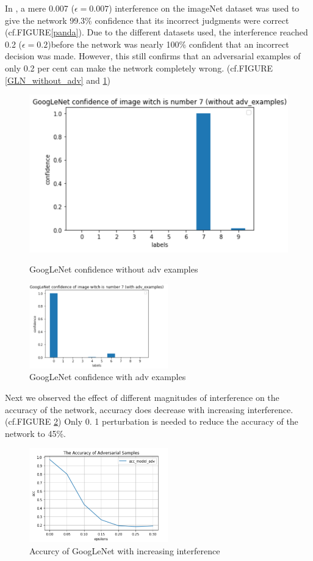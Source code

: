 In \cite{szegedy2013intriguing}, a mere 0.007 ($\epsilon=0.007$) interference on the imageNet dataset was used to give the network 99.3\% confidence that its incorrect judgments were correct (cf.FIGURE\ref{panda}). Due to the different datasets used, the interference reached 0.2 ($\epsilon=0.2$)before the network was nearly 100\% confident that an incorrect decision was made. However, this still confirms that an adversarial examples of only 0.2 per cent can make the network completely wrong. (cf.FIGURE \ref{GLN_without_adv} and \ref{GLN_with_adv})

\begin{figure}[htbp]
\centering
\begin{minipage}[t]{0.48\textwidth}
\centering
\includegraphics[width=6 cm]{GLN confiance without adv 7.png}
\caption{GoogLeNet confidence without adv examples}
\label{GLN_without_adv}
\end{minipage}
\begin{minipage}[t]{0.48\textwidth}
\centering
\includegraphics[width=6cm]{GLN confiance with adv 7.png}
\caption{GoogLeNet confidence with adv examples}
\label{GLN_with_adv}
\end{minipage}
\end{figure}
Next we observed the effect of different magnitudes of interference on the accuracy of the network, accuracy does decrease with increasing interference. (cf.FIGURE \ref{acc_GLN}) Only 0. 1 perturbation is needed to reduce the accuracy of the network to 45\%.
\FloatBarrier
\begin{figure}[htbp]
        \centering
        \includegraphics[width=6cm]{Acc of GLN with adv exp.PNG}%
        \caption{Accurcy of GoogLeNet with increasing interference}
        \label{acc_GLN}
\end{figure}\par
\FloatBarrier

